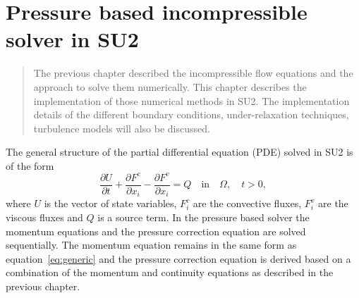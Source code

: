 \chapter[Pressure based incompressible solver in SU2]{Pressure based incompressible solver in SU2}
\label{ch:ch3su2eqn}


\begin{abstract}
The previous chapter described the incompressible flow equations and the approach to solve them numerically. This chapter describes the implementation of those numerical methods in SU2. The implementation details of the different boundary conditions, under-relaxation techniques, turbulence models will also be discussed.
\end{abstract}
%

The general structure of the partial differential equation (PDE) solved in SU2 is of the form~\cite{SU22014} 
\begin{equation}
\frac{\partial U}{\partial t}  + \frac{\partial F^c}{\partial x_i}-\frac{\partial F^v}{\partial x_i}=Q \quad \text{in} \quad \Omega, \quad t>0,
\label{eq:generic}
\end{equation}
where $U$ is the vector of state variables, $F_i^c$ are the convective fluxes, $F^v_i$ are the viscous fluxes and $Q$ is a source term. In the pressure based solver the momentum equations and the pressure correction equation are solved sequentially. The momentum equation remains in the same form as equation~\ref{eq:generic} and the pressure correction equation is derived based on a combination of the momentum and continuity equations as described in the previous chapter. 
